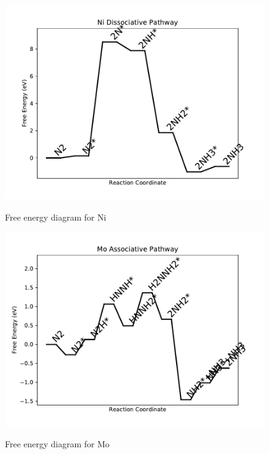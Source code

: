 \documentclass{article}
\begin{document}
\begin{figure}
\includegraphics[width=1\linewidth]{data/plots/Ni_dissociative.pdf}
\label{fig:Ni_dissociative}
\caption{Free energy diagram for Ni}
\end{figure}

\clearpage
\begin{figure}
\includegraphics[width=1\linewidth]{data/plots/Mo_associative.pdf}
\label{fig:Mo_associative}
\caption{Free energy diagram for Mo}
\end{figure}
\end{document}
